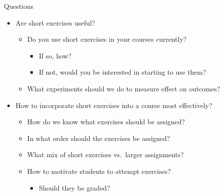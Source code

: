 \documentclass{beamer}
\begin{document}
\begin{frame}{Questions}

\begin{itemize}
\item Are short exercises useful?
  \begin{itemize}
  \item Do you use short exercises in your courses currently?
    \begin{itemize}
    \item If so, how?
    \item If not, would you be interested in starting to use them?
    \end{itemize}
  \item What experiments should we do to measure effect on outcomes?
  \end{itemize}
\item How to incorporate short exercises into a course most effectively?
  \begin{itemize}
  \item How do we know what exercises should be assigned?
  \item In what order should the exercises be assigned?
  \item What mix of short exercises vs.\ larger assignments?
  \item How to motivate students to attempt exercises?
    \begin{itemize}
    \item Should they be graded?
    \end{itemize}
  \end{itemize}
\end{itemize}

\end{frame}
\end{document}
